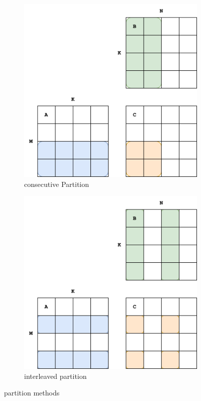 \documentclass{article}
\begin{document}
\begin{figure}[h]
    \centering
    \begin{subfigure}[b]{0.4\linewidth}
        \includegraphics[width=\linewidth]{img/partition.png}
        \caption{consecutive Partition}
        \label{fig:partition}
    \end{subfigure}
    \begin{subfigure}[b]{0.4\linewidth}
        \includegraphics[width=\linewidth]{img/interleave.png}
        \caption{interleaved partition}
        \label{fig:interleave}
    \end{subfigure}
    \caption{partition methods}
\end{figure}
\end{document}

